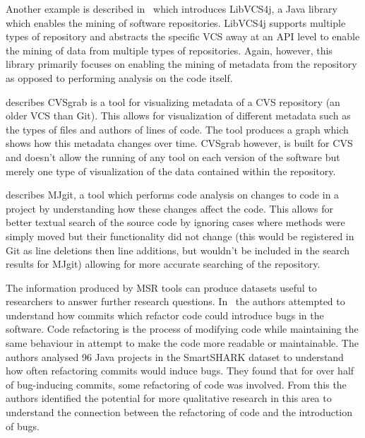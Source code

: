 Another example is described in~\cite{libvcs4j} which introduces LibVCS4j, a Java library which enables the mining of software repositories.
LibVCS4j supports multiple types of repository and abstracts the specific VCS away at an API level to enable the mining of data from multiple types of repositories.
Again, however, this library primarily focuses on enabling the mining of metadata from the repository as opposed to performing analysis on the code itself.

\cite{cvsgrab} describes CVSgrab is a tool for visualizing metadata of a CVS repository (an older VCS than Git).
This allows for visualization of different metadata such as the types of files and authors of lines of code.
The tool produces a graph which shows how this metadata changes over time.
CVSgrab however, is built for CVS and doesn't allow the running of any tool on each version of the software but merely one type of visualization of the data contained within the repository.

\cite{mjgit} describes MJgit, a tool which performs code analysis on changes to code in a project by understanding how these changes affect the code.
This allows for better textual search of the source code by ignoring cases where methods were simply moved but their functionality did not change (this would be registered in Git as line deletions then line additions, but wouldn't be included in the search results for MJgit) allowing for more accurate searching of the repository.

The information produced by MSR tools can produce datasets useful to researchers to answer further research questions.
In~\cite{is_refactoring_always_a_good_egg} the authors attempted to understand how commits which refactor code could introduce bugs in the software.
Code refactoring is the process of modifying code while maintaining the same behaviour in attempt to make the code more readable or maintainable.
The authors analysed 96 Java projects in the SmartSHARK dataset to understand how often refactoring commits would induce bugs.
They found that for over half of bug-inducing commits, some refactoring of code was involved.
From this the authors identified the potential for more qualitative research in this area to understand the connection between the refactoring of code and the introduction of bugs.

